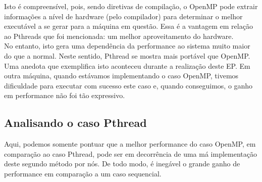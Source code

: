 \documentclass[a4paper, 12pt]{article}
\begin{document}
Isto é compreensível, pois, sendo diretivas de compilação, o OpenMP pode extrair informações a nível de hardware (pelo compilador) para determinar o melhor executável a se gerar para a máquina em questão. Essa é a vantagem em relação ao Pthreads que foi mencionada: um melhor aproveitamento do hardware.\\

No entanto, isto gera uma dependência da performance ao sistema muito maior do que a normal. Neste sentido, Pthread se mostra mais portável que OpenMP. Uma anedota que exemplifica isto aconteceu durante a realização deste EP. Em outra máquina, quando estávamos implementando o caso OpenMP, tivemos dificuldade para executar com sucesso este caso e, quando conseguimos, o ganho em performance não foi tão expressivo.

\subsection{Analisando o caso Pthread}

Aqui, podemos somente pontuar que a melhor performance do caso OpenMP, em comparação ao caso Pthread, pode ser em decorrência de uma má implementação deste segundo método por nós. De todo modo, é inegável o grande ganho de performance em comparação a um caso sequencial.
\end{document}
